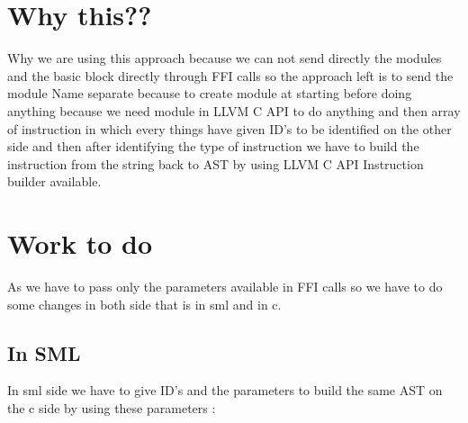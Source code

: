 \documentclass[openany]{book}
\begin{document}
\section{Why this??}
Why we are using this approach because we can not send directly the modules and the basic block directly through FFI calls so the approach left is to send the module Name separate because to create module at starting before doing anything because we need module in LLVM C API to do anything and then array of instruction in which every things have given ID's to be identified on the other side and then after identifying the type of instruction we have to build the instruction from the string back to AST by using LLVM C API Instruction builder available.

\section{Work to do}
As we have to pass only the parameters available in FFI calls so we have to do some changes in both side that is in sml and in c.

\subsection{In SML}
In sml side we have to give ID's and the parameters to build the same AST on the c side by using these parameters :\newpage
\end{document}
